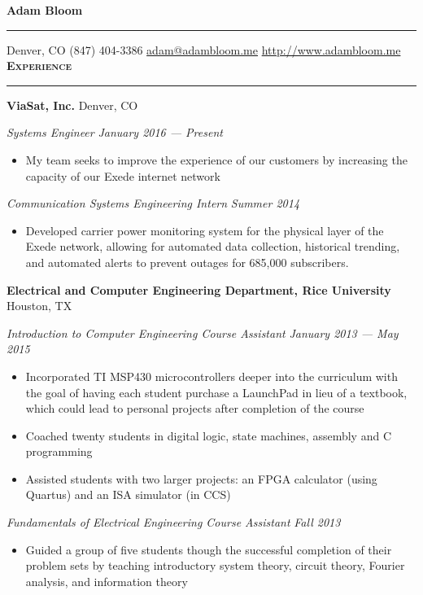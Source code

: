 \documentclass[10pt,letterpaper]{article}
\newcommand*{\seriffont}{\fontfamily{yv1}\selectfont}
\newcommand{\printName}[1]{
{\huge \textbf{#1}}
\vspace{0.25em}
\hrule
\vspace{0.25em}
}
\newenvironment{resumeSection}[1]{
{\Large \textbf{\textsc{#1}}}
\vspace{0.25em}
\hrule
\vspace{0.5em}
}{

}
\newenvironment{employer}[2]{
{\large \textbf{#1} \hfill #2} \newline
}{
\vspace{0.5em}
}
\newenvironment{position}[2]{
{\large \emph{#1} \hfill \emph{#2}}
\seriffont 
\begin{itemize}[noitemsep,topsep=0pt]
}{
\end{itemize}
\vspace{0.5em}
}
\begin{document}
\printName{Adam Bloom}
Denver, CO \hfill (847) 404-3386 \hfill \href{mailto:adam@adambloom.me}{adam@adambloom.me} \hfill \href{http://www.adambloom.me}{http://www.adambloom.me}
\vspace{0.5em} \newline
\begin{resumeSection}{Experience}
\begin{employer}{ViaSat, Inc.}{Denver, CO}
\begin{position}{Systems Engineer}{January 2016 --- Present}
\item My team seeks to improve the experience of our customers by increasing the capacity of our Exede internet network
\end{position}
\begin{position}{Communication Systems Engineering Intern}{Summer 2014}
\item Developed carrier power monitoring system for the physical layer of the Exede network, allowing for automated data collection, historical trending, and automated alerts to prevent outages for 685,000 subscribers.
\end{position}
\end{employer}

\begin{employer}{Electrical and Computer Engineering Department, Rice University}{Houston, TX}
\begin{position}{Introduction to Computer Engineering Course Assistant}{January 2013 --- May 2015}
\item Incorporated TI MSP430 microcontrollers deeper into the curriculum with the goal of having each student purchase a LaunchPad in lieu of a textbook, which could lead to personal projects after completion of the course
\item Coached twenty students in digital logic, state machines, assembly and C programming
\item Assisted students with two larger projects: an FPGA calculator (using Quartus) and an ISA simulator (in CCS)
\end{position}
\begin{position}{Fundamentals of Electrical Engineering Course Assistant}{Fall 2013}
\item Guided a group of five students though the successful completion of their problem sets by teaching introductory system theory, circuit theory, Fourier analysis, and information theory
\end{position}
\end{employer}


\end{resumeSection}
\end{document}
